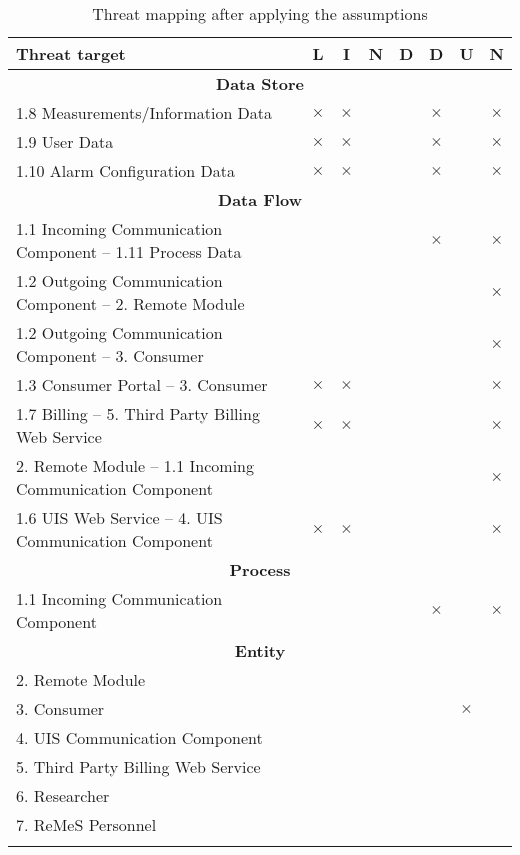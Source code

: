 \begin{center}
	\begin{longtable}{p{9cm}ccccccc}
	\toprule[1pt]
	\bf Threat target & \bf L & \bf I & \bf N & \bf D & \bf D & \bf U & \bf N \\
	\midrule[0.5pt]
	\multicolumn{8}{c}{\textbf{Data Store}} \\
	\midrule[0.5pt]
	\footnotesize 1.8 Measurements/Information Data & $\times$ & $\times$ &  &  & $\times$ &  & $\times$ \\
	\footnotesize 1.9 User Data 					& $\times$ & $\times$ &  &  & $\times$ &  & $\times$ \\
	\footnotesize 1.10 Alarm Configuration Data 	& $\times$ & $\times$ &  &  & $\times$ &  & $\times$ \\
	\midrule[0.5pt]
	\multicolumn{8}{c}{\textbf{Data Flow}} \\
	\midrule[0.5pt]
	\footnotesize 1.1 Incoming Communication Component -- 1.11 Process Data &          &          &  &  & $\times$ & & $\times$ \\
	\footnotesize 1.2 Outgoing Communication Component -- 2. Remote Module 	&          &          &  &  &          & & $\times$ \\
	\footnotesize 1.2 Outgoing Communication Component -- 3. Consumer 		&          &          &  &  &          & & $\times$ \\
	\footnotesize 1.3 Consumer Portal -- 3. Consumer 						& $\times$ & $\times$ &  &  &          & & $\times$ \\
	\footnotesize 1.7 Billing -- 5. Third Party Billing Web Service 		& $\times$ & $\times$ &  &  &          & & $\times$ \\
	\footnotesize 2. Remote Module -- 1.1 Incoming Communication Component  &          &          &  &  &          & & $\times$ \\
	\footnotesize 1.6 UIS Web Service -- 4. UIS Communication Component 	& $\times$ & $\times$ &  &  &          & & $\times$ \\
	\midrule[0.5pt]
	\multicolumn{8}{c}{\textbf{Process}} \\
	\midrule[0.5pt]
	\footnotesize 1.1 Incoming Communication Component 	&  &  &  &  & $\times$ & & $\times$ \\
	\midrule[0.5pt]
	\multicolumn{8}{c}{\textbf{Entity}} \\
	\midrule[0.5pt]
	\footnotesize 2. Remote Module 						&  &  &  &  &  &          & \\
	\footnotesize 3. Consumer 							&  &  &  &  &  & $\times$ & \\
	\footnotesize 4. UIS Communication Component 		&  &  &  &  &  &          & \\
	\footnotesize 5. Third Party Billing Web Service 	&  &  &  &  &  &          & \\
	\footnotesize 6. Researcher 						&  &  &  &  &  &          & \\
	\footnotesize 7. ReMeS Personnel 					&  &  &  &  &  &          & \\
	\bottomrule[1pt]
	\caption{Threat mapping after applying the assumptions}
	\label{table:threat-map-reduced}
	\end{longtable}
\end{center}



